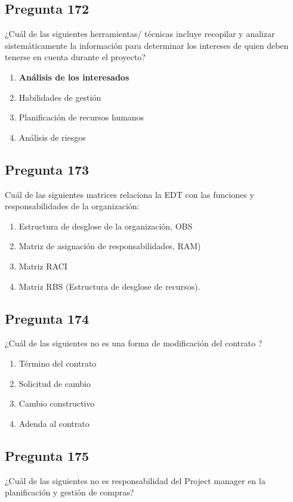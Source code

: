 \documentclass[11pt,a4paper]{article}
\begin{document}
\subsection*{Pregunta 172}
¿Cuál de las siguientes herramientas/ técnicas incluye recopilar y analizar sistemáticamente la información para determinar los intereses de quien deben tenerse en cuenta durante el proyecto?

\begin{enumerate}[label=\alph*)]
  \item \textbf{Análisis de los interesados}
  \item Habilidades de gestión
  \item Planificación de recursos humanos
  \item Análisis de riesgos
\end{enumerate}

\subsection*{Pregunta 173}
Cuál de las siguientes matrices relaciona la EDT con las funciones y responsabilidades de la organización:

\begin{enumerate}[label=\alph*)]
  \item Estructura de desglose de la organización, OBS
  \item Matriz de asignación de responsabilidades, RAM)
  \item Matriz RACI
  \item Matriz RBS (Estructura de desglose de recursos).
\end{enumerate}

\subsection*{Pregunta 174}
¿Cuál de las siguientes no es una forma de modificación del contrato ?

\begin{enumerate}[label=\alph*)]
  \item Término del contrato
  \item Solicitud de cambio
  \item Cambio constructivo
  \item Adenda al contrato
\end{enumerate}

\subsection*{Pregunta 175}
¿Cuál de las siguientes no es responsabilidad del Project manager en la planificación y gestión de compras?
\end{document}
